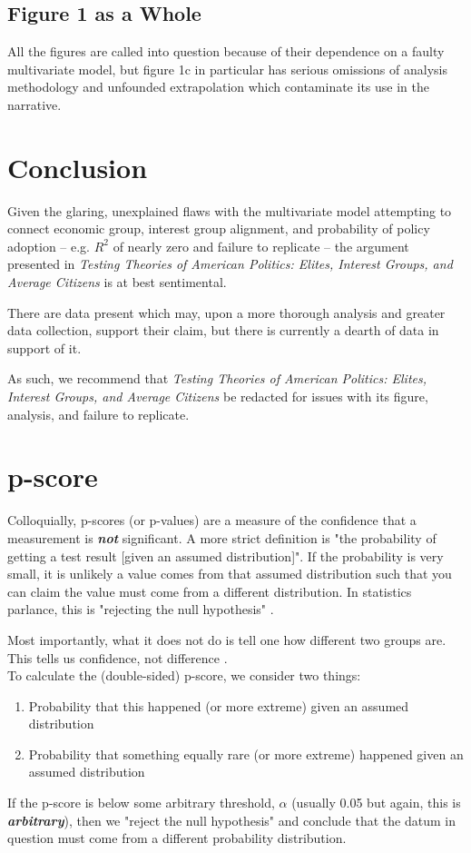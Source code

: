 \documentclass[]{article}
\begin{document}
\subsection{Figure 1 as a Whole}
All the figures are called into question because of their dependence on a faulty multivariate model, but figure 1c in particular has serious omissions of analysis methodology and unfounded extrapolation which contaminate its use in the narrative.


\section{Conclusion}
Given the glaring, unexplained flaws with the multivariate model attempting to connect economic group, interest group alignment, and probability of policy adoption -- e.g. $R^2$ of nearly zero and failure to replicate -- the argument presented in \textit{Testing Theories of American Politics: Elites, Interest Groups, and Average Citizens} is at best sentimental.

There are data present which may, upon a more thorough analysis and greater data collection, support their claim, but there is currently a dearth of data in support of it.

As such, we recommend that \textit{Testing Theories of American Politics: Elites, Interest Groups, and Average Citizens} be redacted for issues with its figure, analysis, and failure to replicate.

\newpage


\newpage
\appendix
\section{p-score}
\label{section_p-score}
Colloquially, p-scores (or p-values) are a measure of the confidence that a measurement is \textbf{\textit{not}} significant. 
A more strict definition is "the probability of getting a test result [given an assumed distribution]". 
If the probability is very small, it is unlikely a value comes from that assumed distribution such that you can claim the value must come from a different distribution.
In statistics parlance, this is "rejecting the null hypothesis" \cite{introstats, statquest_1, statquest_2}.

Most importantly, what it does not do is tell one how different two groups are. This tells us confidence, not difference \cite{statquest_1, statquest_2}.\\

To calculate the (double-sided) p-score, we consider two things:
\begin{enumerate}
	\item Probability that this happened (or more extreme) given an assumed distribution
	\item Probability that something equally rare (or more extreme) happened given an assumed distribution
\end{enumerate}
If the p-score is below some arbitrary threshold, $\alpha$ (usually 0.05 but again, this is \textbf{\textit{arbitrary}}), then we "reject the null hypothesis" and conclude that the datum in question must come from a different probability distribution.
\end{document}
